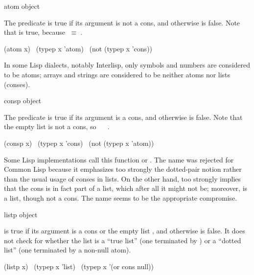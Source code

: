 \begin{defun}[Function]
atom object

The predicate  is true if its argument is not a cons,
and otherwise is false.
Note that  is true, because {\empty}$\;\equiv\;${\nil}.
\begin{lisp}
(atom x) \EQ\ (typep x 'atom) \EQ\ (not (typep x 'cons))
\end{lisp}

\beforenoterule
\begin{incompatibility}
In some Lisp dialects, notably Interlisp,
only symbols and numbers are considered to be atoms; arrays
and strings are considered to be neither atoms nor lists (conses).
\end{incompatibility}
\afternoterule
\end{defun}

\begin{defun}[Function]
consp object

The predicate  is true if its argument is a cons,
and otherwise is false.
Note that the empty list is not a cons, so
 \EQ\  \EV\ {\nil}.
\begin{lisp}
(consp x) \EQ\ (typep x 'cons) \EQ\ (not (typep x 'atom))
\end{lisp}

\beforenoterule
\begin{incompatibility}
Some Lisp implementations call this function
 or .  The name  was rejected for Common Lisp
because it emphasizes too strongly the dotted-pair notion rather than the
usual usage of conses in lists.  On the other hand,  too strongly
implies that the cons is in fact part of a list, which after all it might
not be; moreover, {\empty} is a list, though not a cons.
The name  seems to be the appropriate compromise.
\end{incompatibility}
\afternoterule
\end{defun}

\begin{defun}[Function]
listp object

 is true if its argument is a cons or the empty list {\empty},
and otherwise is false.  It does not check for whether the list
is a ``true list'' (one terminated by {\nil}) or a ``dotted list''
(one terminated by a non-null atom).
\begin{lisp}
(listp x) \EQ\ (typep x 'list) \EQ\ (typep x '(or cons null))
\end{lisp}
\end{defun}

